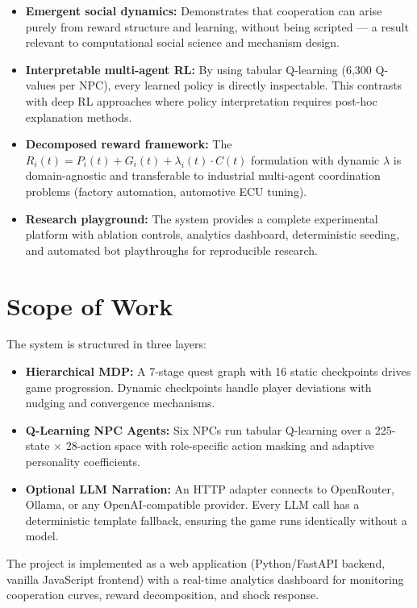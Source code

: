 \documentclass[12pt, a4paper, oneside]{report}
\begin{document}
\begin{itemize}
    \item \textbf{Emergent social dynamics:} Demonstrates that cooperation can arise purely from reward structure and learning, without being scripted --- a result relevant to computational social science and mechanism design.
    \item \textbf{Interpretable multi-agent RL:} By using tabular Q-learning (6,300 Q-values per NPC), every learned policy is directly inspectable. This contrasts with deep RL approaches where policy interpretation requires post-hoc explanation methods.
    \item \textbf{Decomposed reward framework:} The $R_i(t) = P_i(t) + G_i(t) + \lambda_i(t) \cdot C(t)$ formulation with dynamic $\lambda$ is domain-agnostic and transferable to industrial multi-agent coordination problems (factory automation, automotive ECU tuning).
    \item \textbf{Research playground:} The system provides a complete experimental platform with ablation controls, analytics dashboard, deterministic seeding, and automated bot playthroughs for reproducible research.
\end{itemize}

\section{Scope of Work}
\label{sec:scope}

The system is structured in three layers:

\begin{itemize}
    \item \textbf{Hierarchical MDP:} A 7-stage quest graph with 16 static checkpoints drives game progression. Dynamic checkpoints handle player deviations with nudging and convergence mechanisms.
    \item \textbf{Q-Learning NPC Agents:} Six NPCs run tabular Q-learning over a 225-state $\times$ 28-action space with role-specific action masking and adaptive personality coefficients.
    \item \textbf{Optional LLM Narration:} An HTTP adapter connects to OpenRouter, Ollama, or any OpenAI-compatible provider. Every LLM call has a deterministic template fallback, ensuring the game runs identically without a model.
\end{itemize}

The project is implemented as a web application (Python/FastAPI backend, vanilla JavaScript frontend) with a real-time analytics dashboard for monitoring cooperation curves, reward decomposition, and shock response.
\end{document}
